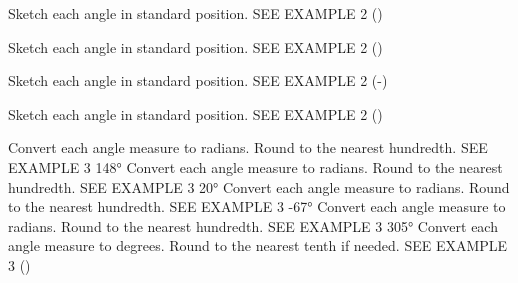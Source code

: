 \documentclass{article}
\newenvironment{practice}[2]{}{}        %
\newcommand{\answer}[1]{}               %
\newcommand{\placeholder}[2]{}          %
\begin{document}
\begin{practice}{23}{2}
Sketch each angle in standard position. SEE EXAMPLE 2
()
\answer{See graph.}
\placeholder{graph}{Black arrowed x,y axes without ticks. Blue initial ray positive x and terminal ray135° in II. Red counterclockwise arc.}
\end{practice}
\begin{practice}{24}{2}
Sketch each angle in standard position. SEE EXAMPLE 2
(\frac{})
\answer{See graph.}
\placeholder{graph}{Black arrowed x,y axes without ticks. Blue initial ray positive x and terminal ray60° in I. Red counterclockwise arc.}
\end{practice}
\begin{practice}{25}{2}
Sketch each angle in standard position. SEE EXAMPLE 2
(-)
\answer{See graph.}
\placeholder{graph}{Black arrowed x,y axes without ticks. Blue initial ray positive x and terminal ray240° in III. Red clockwise arc through IV to III.}
\end{practice}
\begin{practice}{26}{2}
Sketch each angle in standard position. SEE EXAMPLE 2
()
\answer{See graph.}
\placeholder{graph}{Black arrowed x,y axes without ticks. Blue initial ray positive x and terminal ray negative y. Red counterclockwise three-quarter arc.}
\end{practice}
\begin{practice}{27}{1}
Convert each angle measure to radians. Round to the nearest hundredth. SEE EXAMPLE 3
148° \answer{2.58}
\end{practice}
\begin{practice}{28}{1}
Convert each angle measure to radians. Round to the nearest hundredth. SEE EXAMPLE 3
20° \answer{0.35 or (\frac\pi9)}
\end{practice}
\begin{practice}{29}{1}
Convert each angle measure to radians. Round to the nearest hundredth. SEE EXAMPLE 3
-67° \answer{-1.17}
\end{practice}
\begin{practice}{30}{1}
Convert each angle measure to radians. Round to the nearest hundredth. SEE EXAMPLE 3
305° \answer{5.32}
\end{practice}
\begin{practice}{31}{1}
Convert each angle measure to degrees. Round to the nearest tenth if needed. SEE EXAMPLE 3
() \answer{120°}
\end{practice}
\end{document}
